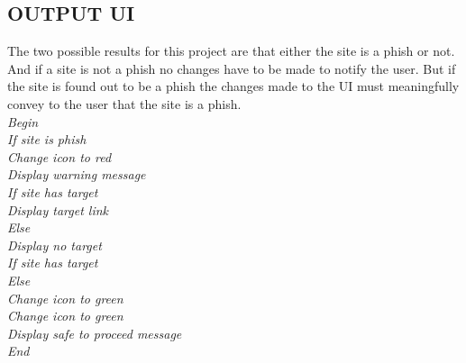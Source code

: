 \subsection{OUTPUT UI}
The two possible results for this project are that either the site is a phish or not. And if a site is not a phish no changes have to be made to notify the user. But if the site is found out to be a phish the changes made to the UI must meaningfully convey to the user that the site is a phish.\\
\null\quad\textit{Begin}\\
\null\quad\quad\textit{If site is phish}\\
\null\quad\quad\quad\textit{Change icon to red}\\
\null\quad\quad\quad\textit{Display warning message}\\
\null\quad\quad\quad\textit{If site has target}\\
\null\quad\quad\quad\quad\textit{Display target link}\\
\null\quad\quad\quad\textit{Else}\\
\null\quad\quad\quad\quad\textit{Display no target}\\
\null\quad\quad\quad\textit{If site has target}\\
\null\quad\quad\textit{Else}\\
\null\quad\quad\quad\textit{Change icon to green}\\
\null\quad\quad\quad\textit{Change icon to green}\\
\null\quad\quad\textit{Display safe to proceed message}\\
\null\quad\textit{End}\\










































